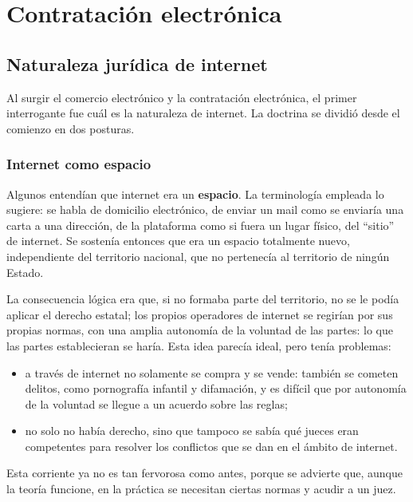 \documentclass[12pt,oneside]{book}
\begin{document}
\chapter[Contratación electrónica]{Contratación electrónica}

\section{Naturaleza jurídica de internet}

Al surgir el comercio electrónico y la contratación electrónica, el primer interrogante fue cuál es la naturaleza de internet. La doctrina se dividió desde el comienzo en dos posturas.

\subsection{Internet como espacio}

Algunos entendían que internet era un \textbf{espacio}. La terminología empleada lo sugiere: se habla de domicilio electrónico, de enviar un mail como se enviaría una carta a una dirección, de la plataforma como si fuera un lugar físico, del ``sitio'' de internet. Se sostenía entonces que era un espacio totalmente nuevo, independiente del territorio nacional, que no pertenecía al territorio de ningún Estado.

La consecuencia lógica era que, si no formaba parte del territorio, no se le podía aplicar el derecho estatal; los propios operadores de internet se regirían por sus propias normas, con una amplia autonomía de la voluntad de las partes: lo que las partes establecieran se haría. Esta idea parecía ideal, pero tenía problemas:

\begin{itemize}
    \item a través de internet no solamente se compra y se vende: también se cometen delitos, como pornografía infantil y difamación, y es difícil que por autonomía de la voluntad se llegue a un acuerdo sobre las reglas;
    \item no solo no había derecho, sino que tampoco se sabía qué jueces eran competentes para resolver los conflictos que se dan en el ámbito de internet.
\end{itemize}

Esta corriente ya no es tan fervorosa como antes, porque se advierte que, aunque la teoría funcione, en la práctica se necesitan ciertas normas y acudir a un juez.
\end{document}
